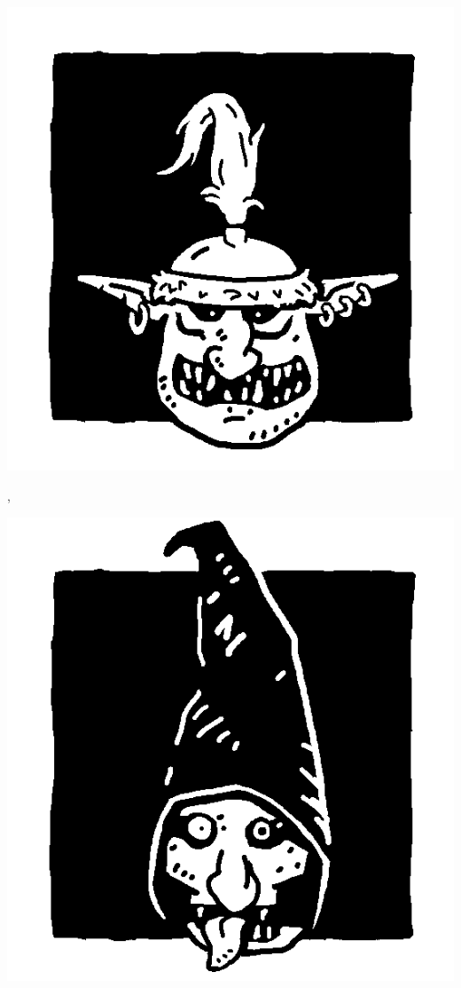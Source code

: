 \begin{multicols}{3}\raggedcolumns

\begin{center}
\includegraphics[width=\logosize]{pics/commongoblin.png}
\vspace*{-1cm}\subsubtitle{\commongoblin}

\unruly{}, \insignificant{}
\end{center}

\columnbreak

\begin{center}
\includegraphics[width=\logosize]{pics/cavegoblin.png}
\vspace*{-1cm}\subsubtitle{\cavegoblin}


\end{center}
\end{multicols}
